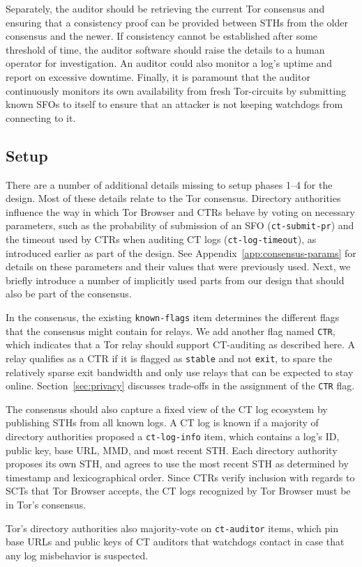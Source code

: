 Separately, the auditor should be retrieving the current Tor consensus and
ensuring that a consistency proof can be provided between STHs from the older
consensus and the newer. If consistency cannot be established after some
threshold of time, the auditor software should raise the details to a human
operator for investigation. An auditor could also monitor a log's uptime and
report on excessive downtime. Finally, it is paramount that the auditor
continuously monitors its own availability from fresh Tor-circuits by submitting
known SFOs to itself to ensure that an attacker is not keeping watchdogs from
connecting to it.

\subsection{Setup} \label{sec:base:consensus}

There are a number of additional details missing to setup phases 1--4 for the
design. Most of these details relate to the Tor consensus. Directory authorities
influence the way in which Tor Browser and CTRs behave by voting on necessary
parameters, such as the probability of submission of an SFO
(\texttt{ct-submit-pr}) and the timeout used by CTRs when auditing CT logs
(\texttt{ct-log-timeout}), as introduced earlier as part of the design. See
Appendix~\ref{app:consensus-params} for details on these parameters and their
values that were previously used. Next, we briefly introduce a number of
implicitly used parts from our design that should also be part of the consensus.

In the consensus, the existing \texttt{known-flags} item determines the
different flags that the consensus might contain for relays.  We add another
flag named \texttt{CTR}, which indicates that a Tor relay should support
CT-auditing as described here. A relay qualifies as a CTR if it is flagged as
\texttt{stable} and not \texttt{exit}, to spare the relatively sparse exit
bandwidth and only use relays that can be expected to stay online.
Section~\ref{sec:privacy} discusses trade-offs in the assignment of the
\texttt{CTR} flag.

The consensus should also capture a fixed view of the CT log ecosystem by
publishing STHs from all known logs.  A CT log is known if a majority of
directory authorities proposed a \texttt{ct-log-info} item, which contains a
log's ID, public key, base URL, MMD, and most recent STH.  Each directory
authority proposes its own STH, and agrees to use the most recent STH as
determined by timestamp and lexicographical order.  Since CTRs verify inclusion
with regards to SCTs that Tor Browser accepts, the CT logs recognized by Tor
Browser must be in Tor's consensus.

Tor's directory authorities also majority-vote on \texttt{ct-auditor} items,
which pin base URLs and public keys of CT auditors that watchdogs contact in
case that any log misbehavior is suspected. 
